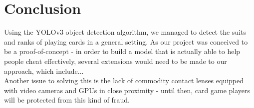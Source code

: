 \documentclass[a4paper]{article}
\begin{document}
\section{Conclusion}
Using the YOLOv3 object detection algorithm, we managed to detect the suits and ranks of playing cards in a general setting. As our project was conceived to be a proof-of-concept - in order to build a model that is actually able to help people cheat effectively, several extensions would need to be made to our approach, which include... \\ Another issue to solving this is the lack of commodity contact lenses equipped with video cameras and GPUs in close proximity - until then, card game players will be protected from this kind of fraud.
  


\end{document}
